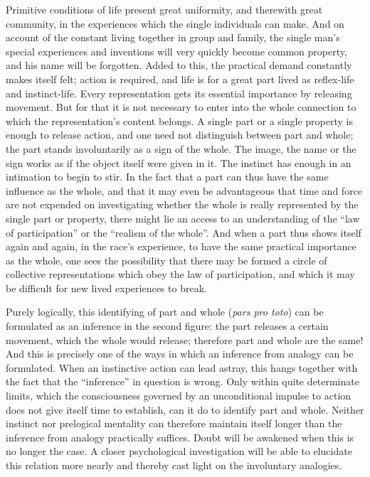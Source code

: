 \documentclass[12pt]{book}
\newcommand{\opage}[1]{\marginnote{\footnotesize\textit{[#1]}}}
\begin{document}
Primitive conditions of life present great uni\-for\-mity, and therewith great
com\-mu\-nity, in the experiences which the single individuals can make. And on
account of the constant living together in group and family, the single man's
special experiences and \opage{15}inventions will very quickly become common property,
and his name will be forgotten. Added to this, the practical demand constantly
makes itself felt; action is required, and life is for a great part lived as
reflex-life and instinct-life. Every representation gets its essential
importance by releasing movement. But for that it is not necessary to enter
into the whole connection to which the representation's content belongs. A
single part or a single property is enough to release action, and one need not
distinguish between part and whole; the part stands involuntarily as a sign of
the whole. The image, the name or the sign works as if the object itself were
given in it. The instinct has enough in an intimation to begin to stir. In the
fact that a part can thus have the same influence as the whole, and that it may
even be advantageous that time and force are not expended on investigating
whether the whole is really represented by the single part or property, there
might lie an access to an understanding of the ``law of participation'' or the
``realism of the whole''. And when a part thus shows itself again and again, in
the race's experience, to have the same practical importance as the whole, one
sees the possibility that there may be formed a circle of collective
representations which obey the law of participation, and which it may be
difficult for new lived experiences to break.

Purely logically, this identifying of part and whole (\textit{pars pro toto})
can be formulated as an inference in the second figure: the part releases a
certain movement, which the whole would release; therefore part and whole are
the same! And this is precisely one of the ways in which an inference from
analogy can be formulated. When an instinctive action can lead astray, this
hangs together with the fact that the ``inference'' in question is wrong. Only
within quite determinate limits, which the consciousness governed by an
unconditional \opage{16}impulse to action does not give itself time to establish, can it
do to identify part and whole. Neither instinct nor prelogical mentality can
therefore maintain itself longer than the inference from analogy practically
suffices. Doubt will be awakened when this is no longer the case. A closer
psychological investigation will be able to elucidate this relation more nearly
and thereby cast light on the involuntary analogies.
\end{document}
